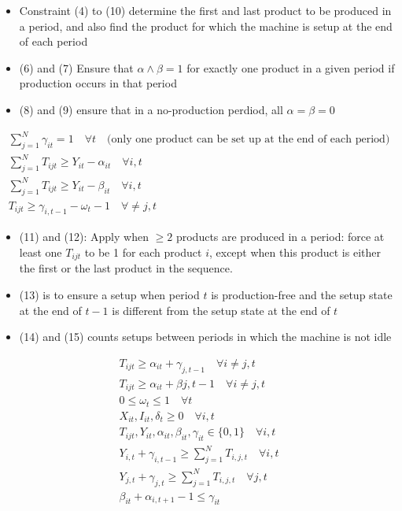 \documentclass[10pt]{article}
\begin{document}
\newpage 
\begin{itemize}
    \item Constraint (4) to (10) determine the first and last product to be produced in a period, and also find the product for which the machine is setup at the end of each period 
    \item (6) and (7) Ensure that $\alpha \land\beta = 1$ for exactly one product in a given period if production occurs in that period 
    \item (8) and (9) ensure that in a no-production perdiod, all $\alpha = \beta = 0 $
\end{itemize}
\begin{gather}
    \sum_{j = 1}^{N}\gamma_{it} = 1\quad\forall t\quad\text{(only one product can be set up at the end of each period)}\\
    \sum_{j = 1}^{N}T_{ijt}\ge Y_{it} - \alpha_{it}\quad\forall i, t\\
    \sum_{j = 1}^{N}T_{ijt}\ge Y_{it} - \beta_{it}\quad\forall i, t\\
    T_{ijt}\ge \gamma_{i, t - 1} - \omega_t - 1\quad\forall\neq j, t
\end{gather}
\begin{itemize}
    \item (11) and (12): Apply when $\ge 2 $ products are produced in a period: force at least one $T_{ijt} $ to be 1 for each product $i $, except when this product is either the first or the last product in the sequence. 
    \item (13) is to ensure a setup when period $t $ is production-free and the setup state at the end of $t - 1 $ is different from the setup state at the end of $t $
    \item (14) and (15) counts setups between periods in which the machine is not idle
\end{itemize}
\begin{gather}
    T_{ijt}\ge\alpha_{it} + \gamma_{j, t - 1}\quad\forall i\neq j, t\\
    T_{ijt}\ge\alpha_{it} + \beta{j, t - 1}\quad\forall i\neq j, t\\
    0 \le \omega_t\le 1\quad\forall t\\
    X_{it}, I_{it}, \delta_{t}\ge0\quad\forall i, t\\
    T_{ijt}, Y_{it}, \alpha_{it}, \beta_{it}, \gamma_{it}\in\{0, 1\}\quad\forall i, t\\
    Y_{i, t} + \gamma_{i, t - 1} \ge \sum_{j = 1}^{N}T_{i, j, t}\quad\forall i, t\\
    Y_{j, t} + \gamma_{j, t} \ge \sum_{j = 1}^{N}T_{i, j, t}\quad\forall j, t\\
    \beta_{it} + \alpha_{i, t + 1} - 1 \le \gamma_{it}
\end{gather}
\newpage 
\end{document}
